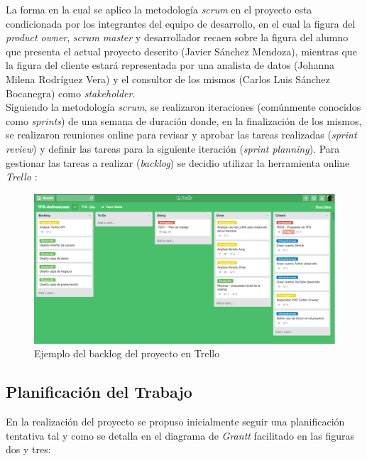 \documentclass[11pt,a4paper]{article}
\begin{document}
La forma en la cual se aplico la metodología \textit{scrum} en el proyecto esta condicionada por los integrantes del equipo de desarrollo, en el cual la figura del \textit{product owner}, \textit{scrum master} y desarrollador recaen sobre la figura del alumno que presenta el actual proyecto descrito (Javier Sánchez Mendoza), mientras que la figura del cliente estará representada por una analista de datos (Johanna Milena Rodríguez Vera) y el consultor de los mismos (Carlos Luis Sánchez Bocanegra) como \textit{stakeholder}.
\\

Siguiendo la metodología \textit{scrum}, se realizaron iteraciones (comúnmente conocidos como \textit{sprints}) de una semana de duración donde, en la finalización de los mismos, se realizaron reuniones online para revisar y aprobar las tareas realizadas (\textit{sprint review}) y definir las tareas para la siguiente iteración (\textit{sprint planning}). Para gestionar las tareas a realizar (\textit{backlog}) se decidio utilizar la herramienta online \textit{Trello} \cite{9}:
\\

\begin{figure}[hbtp]
\centering
\includegraphics[scale=0.3]{planificacion/trello-backlog.png}
\caption{Ejemplo del backlog del proyecto en Trello}
\end{figure}
\medskip 

\subsection{Planificación del Trabajo}
En la realización del proyecto se propuso inicialmente seguir una planificación tentativa tal y como se detalla en el diagrama de \textit{Grantt} facilitado en las figuras dos y tres:
\end{document}
